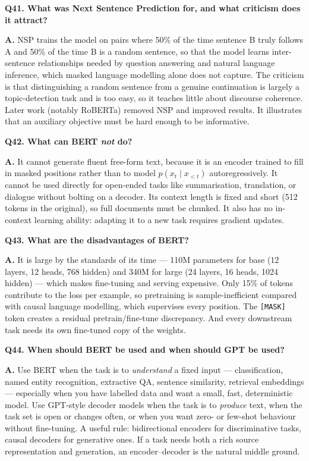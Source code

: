 \documentclass[11pt]{article}
\begin{document}
\medskip
\noindent\textbf{Q41. What was Next Sentence Prediction for, and what criticism does it attract?}

\noindent\textbf{A.} NSP trains the model on pairs where 50\% of the time sentence B truly follows A and 50\% of the time B is a random sentence, so that the model learns inter-sentence relationships needed by question answering and natural language inference, which masked language modelling alone does not capture. The criticism is that distinguishing a random sentence from a genuine continuation is largely a topic-detection task and is too easy, so it teaches little about discourse coherence. Later work (notably RoBERTa) removed NSP and improved results. It illustrates that an auxiliary objective must be hard enough to be informative.

\medskip
\noindent\textbf{Q42. What can BERT \emph{not} do?}

\noindent\textbf{A.} It cannot generate fluent free-form text, because it is an encoder trained to fill in masked positions rather than to model $p(x_t \mid x_{<t})$ autoregressively. It cannot be used directly for open-ended tasks like summarisation, translation, or dialogue without bolting on a decoder. Its context length is fixed and short (512 tokens in the original), so full documents must be chunked. It also has no in-context learning ability: adapting it to a new task requires gradient updates.

\medskip
\noindent\textbf{Q43. What are the disadvantages of BERT?}

\noindent\textbf{A.} It is large by the standards of its time --- 110M parameters for base (12 layers, 12 heads, 768 hidden) and 340M for large (24 layers, 16 heads, 1024 hidden) --- which makes fine-tuning and serving expensive. Only 15\% of tokens contribute to the loss per example, so pretraining is sample-inefficient compared with causal language modelling, which supervises every position. The \texttt{[MASK]} token creates a residual pretrain/fine-tune discrepancy. And every downstream task needs its own fine-tuned copy of the weights.

\medskip
\noindent\textbf{Q44. When should BERT be used and when should GPT be used?}

\noindent\textbf{A.} Use BERT when the task is to \emph{understand} a fixed input --- classification, named entity recognition, extractive QA, sentence similarity, retrieval embeddings --- especially when you have labelled data and want a small, fast, deterministic model. Use GPT-style decoder models when the task is to \emph{produce} text, when the task set is open or changes often, or when you want zero- or few-shot behaviour without fine-tuning. A useful rule: bidirectional encoders for discriminative tasks, causal decoders for generative ones. If a task needs both a rich source representation and generation, an encoder--decoder is the natural middle ground.
\end{document}
